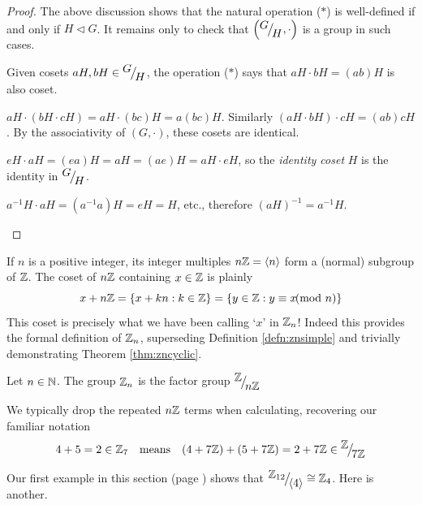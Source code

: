 \begin{proof}
	The above discussion shows that the natural operation ($\ast$) is well-defined if and only if $H\triangleleft G$. It remains only to check that $\smash[b]{\left({}^{\textstyle {G}}\!\big/_{\textstyle \!{H}},\cdot\right)}$ is a group in such cases.
	\begin{description}\itemsep2pt
		\item[\normalfont\emph{Closure}:] Given cosets $aH,bH\in{}^{\textstyle {G}}\!\big/_{\textstyle \!{H}}$,  the operation ($\ast$) says that $aH\cdot bH=(ab)H$ is also coset.
		\item[\normalfont\emph{Associativity}:] $aH\cdot(bH\cdot cH)=aH\cdot(bc)H=a(bc)H$. Similarly $(aH\cdot bH)\cdot cH=(ab)cH$. By the associativity of $(G,\cdot)$, these cosets are identical.
		\item[\normalfont\emph{Identity}:] $eH\cdot aH=(ea)H=aH=(ae)H=aH\cdot eH$, so the \emph{identity coset} $H$ is the identity in ${}^{\textstyle {G}}\!\big/_{\textstyle \!{H}}$.
		\item[\normalfont\emph{Inverse}:] $a^{-1}H\cdot aH=(a^{-1}a)H=eH=H$, etc., therefore $(aH)^{-1}=a^{-1}H$.\qedhere
	\end{description}
\end{proof}

\goodbreak


If $n$ is a positive integer, its integer multiples $n\mathbb{Z}=\left\langle n\right\rangle$ form a (normal) subgroup of $\mathbb{Z}$. The coset of $n\mathbb{Z}$ containing $x\in\mathbb{Z}$ is plainly
\[
	x+n\mathbb{Z}=\{x+kn:k\in\mathbb{Z}\}
	=\{y\in\mathbb{Z}:y\equiv x\negthickspace\negthickspace\pmod n\}
\]
This coset is precisely what we have been calling `$x$' in $\mathbb{Z}_n$! Indeed this provides the formal definition of $\mathbb{Z}_n$, superseding Definition \ref{defn:znsimple} and trivially demonstrating Theorem \ref{thm:zncyclic}.

\begin{defn}{}{}
	Let $n\in\mathbb{N}$. The group $\mathbb{Z}_n$ is the factor group ${}^{\textstyle {\mathbb{Z}}}\!\big/_{\textstyle \!{n\mathbb{Z}}}$
\end{defn}

We typically drop the repeated $n\mathbb{Z}$ terms when calculating, recovering our familiar notation
\[
	4+5=2\in\mathbb{Z}_7\quad\text{means}\quad (4+7\mathbb{Z})+(5+7\mathbb{Z})=2+7\mathbb{Z}\in\smash[b]{{}^{\textstyle {\mathbb{Z}}}\!\big/_{\textstyle \!{7\mathbb{Z}}}}
\]


Our first example in this section (page \pageref{sec:factor}) shows that $\smash{{}^{\textstyle {\mathbb{Z}_{12}}}\!\big/_{\textstyle \!{\left\langle 4\right\rangle}}}\cong\mathbb{Z}_4$. Here is another.

